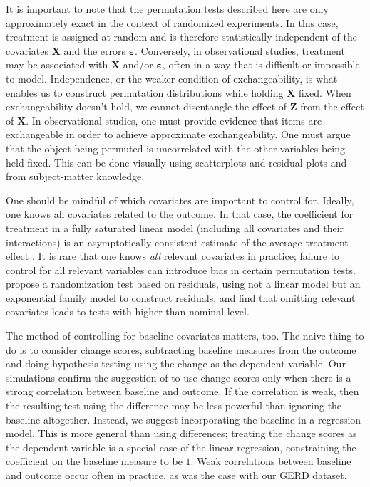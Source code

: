\documentclass[11pt]{article}
\begin{document}
It is important to note that the permutation tests described here are only approximately exact in the context of randomized experiments.
In this case, treatment is assigned at random and is therefore statistically independent of the covariates $\mathbf{X}$ and the errors $\mathbf{\varepsilon}$.
Conversely, in observational studies, treatment may be associated with $\mathbf{X}$ and/or $\mathbf{\varepsilon}$, often in a way that is difficult or impossible to model.
Independence, or the weaker condition of exchangeability, is what enables us to construct permutation distributions while holding $\mathbf{X}$ fixed.
When exchangeability doesn't hold, we cannot disentangle the effect of $\mathbf{Z}$ from the effect of $\mathbf{X}$.
In observational studies, one must provide evidence that items are exchangeable in order to achieve approximate exchangeability.
One must argue that the object being permuted is uncorrelated with the other variables being held fixed.
This can be done visually using scatterplots and residual plots \cite{freedman_nonstochastic_1983} and from subject-matter knowledge.

One should be mindful of which covariates are important to control for.
Ideally, one knows all covariates related to the outcome.
In that case, the coefficient for treatment in a fully saturated linear model (including all covariates and their interactions) is an asymptotically consistent estimate of the average treatment effect \cite{lin_agnostic_2013}.
It is rare that one knows \textit{all} relevant covariates in practice; failure to control for all relevant variables can introduce bias in certain permutation tests.
 \cite{gail_tests_1988} propose a randomization test based on residuals, using not a linear model but an exponential family model to construct residuals, and find that omitting relevant covariates leads to tests with higher than nominal level.
 
The method of controlling for baseline covariates matters, too.
The naive thing to do is to consider change scores, subtracting baseline measures from the outcome and doing hypothesis testing using the change as the dependent variable.
Our simulations confirm the suggestion of \cite{frison_repeated_1992} to use change scores only when there is a strong correlation between baseline and outcome.
If the correlation is weak, then the resulting test using the difference may be less powerful than ignoring the baseline altogether.
Instead, we suggest incorporating the baseline in a regression model.
This is more general than using differences;
treating the change scores as the dependent variable is a special case of the linear regression, constraining the coefficient on the baseline measure to be $1$.
Weak correlations between baseline and outcome occur often in practice, as was the case with our GERD dataset.
\end{document}
